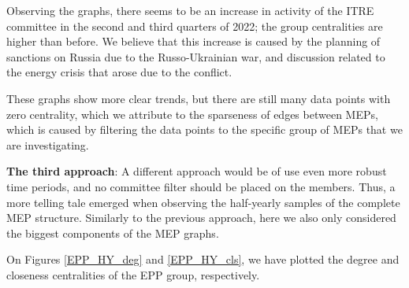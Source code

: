 \documentclass[lettersize,journal]{IEEEtran}
\begin{document}
Observing the graphs, there seems to be an increase in activity of the ITRE committee in the second and third quarters of 2022; the group centralities are higher than before. We believe that this increase is caused by the planning of sanctions on Russia due to the Russo-Ukrainian war, and discussion related to the energy crisis that arose due to the conflict.

These graphs show more clear trends, but there are still many data points with zero centrality, which we attribute to the sparseness of edges between MEPs, which is caused by filtering the data points to the specific group of MEPs that we are investigating. 

\textbf{The third approach}: A different approach would be of use even more robust time periods, and no committee filter should be placed on the members. Thus, a more telling tale emerged when observing the half-yearly samples of the complete MEP structure. Similarly to the previous approach, here we also only considered the biggest components of the MEP graphs. 

On Figures \ref{EPP_HY_deg} and \ref{EPP_HY_cls}, we have plotted the degree and closeness centralities of the EPP group, respectively.
\end{document}
